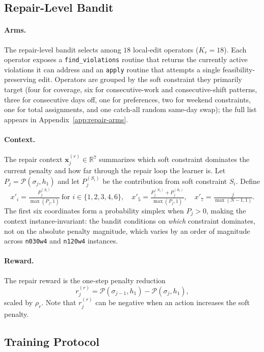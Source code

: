 \documentclass{article}
\begin{document}
\subsection{Repair-Level Bandit}

\paragraph{Arms.}
The repair-level bandit selects among $18$ local-edit operators
($K_r = 18$). Each operator exposes a \texttt{find\_violations} routine
that returns the currently active violations it can address and an
\texttt{apply} routine that attempts a single feasibility-preserving edit.
Operators are grouped by the soft constraint they primarily target (four
for coverage, six for consecutive-work and consecutive-shift patterns,
three for consecutive days off, one for preferences, two for weekend
constraints, one for total assignments, and one catch-all random same-day
swap); the full list appears in Appendix~\ref{app:repair-arms}.

\paragraph{Context.}
The repair context $\mathbf{x}^{(r)}_j \in \mathbb{R}^{7}$ summarizes
which soft constraint dominates the current penalty and how far through
the repair loop the learner is. Let $P_j = \mathcal{P}(\sigma_j, h_1)$ and
let $P_j^{(S_i)}$ be the contribution from soft constraint $S_i$. Define
\[
x'_i = \tfrac{P_j^{(S_i)}}{\max(P_j, 1)}
       \ \text{for } i \in \{1, 2, 3, 4, 6\},
\quad
x'_5 = \tfrac{P_j^{(S_5)} + P_j^{(S_7)}}{\max(P_j, 1)},
\quad
x'_7 = \tfrac{j}{\max(N - 1, 1)}.
\]
The first six coordinates form a probability simplex when $P_j > 0$,
making the context instance-invariant: the bandit conditions on
\emph{which} constraint dominates, not on the absolute penalty magnitude,
which varies by an order of magnitude across \texttt{n030w4} and
\texttt{n120w4} instances.

\paragraph{Reward.}
The repair reward is the one-step penalty reduction
\[
r^{(r)}_j
= \mathcal{P}(\sigma_{j-1}, h_1) - \mathcal{P}(\sigma_j, h_1),
\]
scaled by $\rho_r$. Note that $r^{(r)}_j$ can be negative when an action
increases the soft penalty.

\subsection{Training Protocol}
\label{sec:training}
\end{document}
